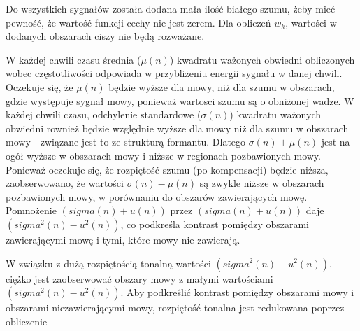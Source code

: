\documentclass[eng,printmode]{mgr}
\begin{document}
  Do wszystkich sygnałów została dodana mała ilość białego szumu, żeby mieć pewność, że wartość funkcji cechy nie jest zerem. Dla obliczeń $w_{k}$, wartości w dodanych obszarach ciszy nie będą rozważane. 
  
  W każdej chwili czasu średnia ($\mu(n)$) kwadratu ważonych obwiedni obliczonych  wobec częstotliwości odpowiada w przybliżeniu energii sygnału w danej chwili. Oczekuje się, że $\mu(n)$ będzie wyższe dla mowy, niż dla szumu w obszarach, gdzie występuje sygnał mowy, ponieważ wartosci szumu są o obniżonej wadze. W każdej chwili czasu, odchylenie standardowe ($\sigma(n)$) kwadratu ważonych obwiedni rownież będzie względnie wyższe dla mowy niż dla szumu w obszarach mowy - związane jest to ze strukturą formantu. Dlatego $\sigma(n)+ \mu(n)$ jest na ogół wyższe w obszarach mowy i niższe w regionach pozbawionych mowy. Ponieważ oczekuje się, że rozpiętość szumu (po kompensacji) będzie niższa, zaobserwowano, że wartości $\sigma(n)-\mu(n)$ są zwykle niższe w obszarach pozbawionych mowy, w porównaniu do obszarów zawierających mowę. Pomnożenie $(sigma(n) + u(n))$ przez $(sigma(n)+ u(n))$ daje $(sigma^2(n) - u^2(n))$, co podkreśla kontrast pomiędzy obszarami zawierającymi mowę i tymi, które mowy nie zawierają.
  
  W związku z dużą rozpiętością tonalną wartości $(sigma^2(n) - u^2(n))$, ciężko jest zaobserwować obszary mowy z małymi wartościami  $(sigma^2(n) - u^2(n))$. Aby podkreślić kontrast pomiędzy obszarami mowy i obszarami niezawierającymi mowy, rozpiętość tonalna jest redukowana poprzez obliczenie
  
\end{document}
